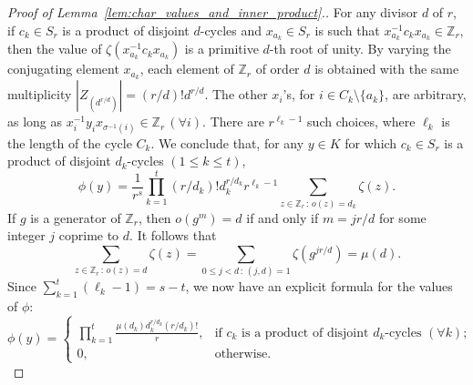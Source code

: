 \documentclass[10pt]{article}
\theoremstyle{definition}
\def\ZZ{{\mathbb Z}}
\begin{document}
\begin{proof}[Proof of  Lemma~\ref{lem:char_values_and_inner_product}.]
    For any divisor $d$ of $r$,
    if $c_k \in S_r$ is a product of disjoint $d$-cycles
    and $x_{a_k} \in S_r$ is such that $x_{a_k}^{-1}c_kx_{a_k} \in \ZZ_r$, 
    then the value of $\zeta(x_{a_k}^{-1}c_kx_{a_k})$ is a primitive $d$-th root of unity. By varying the conjugating element $x_{a_k}$, each element of $\ZZ_r$ of order $d$ is obtained with the same multiplicity $|Z_{(d^{r/d})}| = (r/d)! d^{r/d}$.  
    The other $x_i$'s, for $i \in C_k \setminus \{a_k\}$, are arbitrary, as long as $x_i^{-1}y_ix_{\sigma^{-1}(i)}\in \ZZ_r\,(\forall i)$. There are $r^{\ell_k - 1}$ such choices, where $\ell_k$ is the length of the cycle $C_k$.
    We conclude that, for any $y \in K$ for which $c_k \in S_r$ is a product of disjoint $d_k$-cycles $(1 \le k \le t)$,
    \[
        \phi(y) = \frac{1}{r^s} \prod_{k=1}^{t} 
        (r/d_k)! d_k^{r/d_k} r^{\ell_k - 1} 
        \sum_{z \in \ZZ_r \,:\, o(z) = d_k} \zeta(z).
    \]
    If $g$ is a generator of $\ZZ_r$, then $o(g^m) = d$ if and only if $m = jr/d$ for some integer $j$ coprime to $d$. 
    It follows that
    \[
        \sum_{z \in \ZZ_r \,:\, o(z) = d} \zeta(z) 
        = \sum_{0 \le j < d \,:\, (j,d) = 1} \zeta(g^{jr/d})
        = \mu(d).
    \]
    Since $\sum_{k=1}^{t} (\ell_k - 1) = s-t$,
    we now have an explicit formula for the values of $\phi$:
    \begin{equation}\label{eq:char_value}
	   \phi(y) =
	   \begin{cases}\displaystyle
	       \prod_{k=1}^{t} \frac{\mu(d_k) d_k^{r/d_k} (r/d_k)!}{r}, 
	       &\text{if } c_k \text{ is a product of disjoint } d_k \text{-cycles } (\forall k); \\
	       0, &\text{otherwise.}
	   \end{cases}
    \end{equation}


\end{proof}
\end{document}
